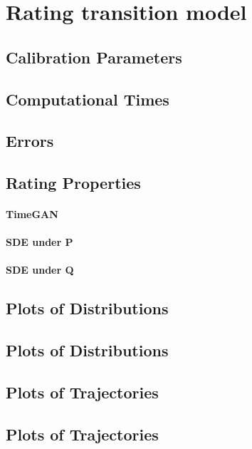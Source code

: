 \section{Rating transition model}
\subsection{Calibration Parameters}
	
	\calibrationParametersP


	\calibrationParametersQ


\subsection{Computational Times}
	
	\compTimes


\subsection{Errors}
	
	\errors


\subsection{Rating Properties}
\paragraph*{TimeGAN}
	
	\mDCRec


	\sDDRec


	\dMLRec


	\iRSRec


	\rSORec


\paragraph*{SDE under P}
	
	\mDCSDEP


	\sDDSDEP


	\dMLSDEP


	\iRSSDEP


	\rSOSDEP


\paragraph*{SDE under Q}
	
	\mDCSDEQ


	\sDDSDEQ


	\dMLSDEQ


	\iRSSDEQ


	\rSOSDEQ


\subsection{Plots of Distributions}
	
\subsection{Plots of Distributions}
	
\subsection{Plots of Trajectories}
	
\subsection{Plots of Trajectories}
	

